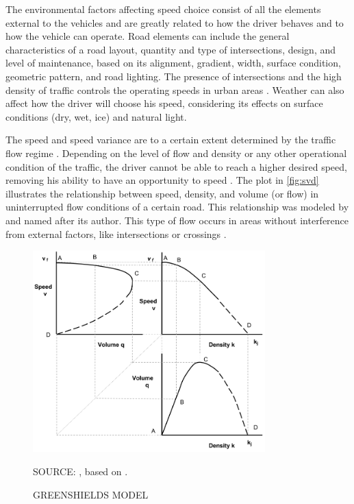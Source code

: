 The environmental factors affecting speed choice consist of all the elements external to the vehicles and are greatly related to how the driver behaves and to how the vehicle can operate. Road elements can include the general characteristics of a road layout, quantity and type of intersections, design, and level of maintenance, based on its alignment, gradient, width, surface condition, geometric pattern, and road lighting. The presence of intersections and the high density of traffic controls the operating speeds in urban areas \cite{Mohan2016a}. Weather can also affect how the driver will choose his speed, considering its effects on surface conditions (dry, wet, ice) and natural light.  

The speed and speed variance are to a certain extent determined by the traffic flow regime \cite{Shinar2017}. Depending on the level of flow and density or any other operational condition of the traffic, the driver cannot be able to reach a higher desired speed, removing his ability to have an opportunity to speed \cite{Richard2013a, Bastos2021}. The plot in \autoref{fig:svd} illustrates the relationship between speed, density, and volume (or flow) in uninterrupted flow conditions of a certain road. This relationship was modeled by \textcite{Greenshields1934} and named after its author. This type of flow occurs in areas without interference from external factors, like intersections or crossings \cite{Green2020}. 

\begin{figure}[!htbp]
    \centering\footnotesize
    \captionsetup{font=footnotesize}
    \caption{GREENSHIELDS MODEL}
    \includegraphics[width=0.8\textwidth]{fig/svd.png}
    \label{fig:svd}
    \par SOURCE: \textcite{Green2020}, based on \textcite{Greenshields1934}.
\end{figure}

